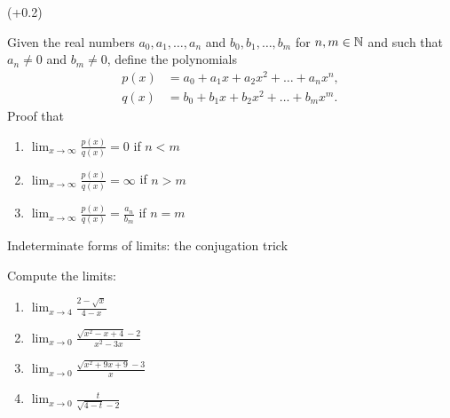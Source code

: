 \documentclass[9pt]{beamer}
\begin{document}
\begin{frame}{ (+0.2)}

    Given the real numbers $a_0, a_1, \dots, a_n$ and $b_0, b_1, \dots, b_m$ for $n, m\in\mathbb{N}$ and such that $a_n \neq 0$ and $b_m \neq 0$, define the polynomials
    \begin{align*}
        p(x) &= a_0 + a_1x + a_2x^2 + \dots + a_n x^n, \\ 
        q(x) &= b_0 + b_1x + b_2x^2 + \dots + b_m x^m.
    \end{align*}
    Proof that
    \begin{enumerate}[leftmargin = 0.5cm, label = (\alph*), rightmargin = 0.2cm]

        \item $\lim_{x\rightarrow \infty} \frac{p(x)}{q(x)} = 0$ if $n < m$
        
        \item $\lim_{x\rightarrow \infty} \frac{p(x)}{q(x)} = \infty$ if $n > m$
        
        \item $\lim_{x\rightarrow \infty} \frac{p(x)}{q(x)} = \frac{a_n}{b_m}$ if $n = m$
        
    \end{enumerate}
    
\end{frame}

\begin{frame}{Indeterminate forms of limits: the conjugation trick}

    Compute the limits:

    \begin{enumerate}[leftmargin = 0.5cm, label = (\alph*), rightmargin = 0.2cm]
        
        \item $\lim_{x\rightarrow 4}\frac{2 - \sqrt{x}}{4 - x}$

        \item $\lim_{x\rightarrow 0}\frac{\sqrt{x^2 - x + 4} - 2}{x^2 - 3x}$

        \item $\lim_{x\rightarrow 0}\frac{\sqrt{x^2 + 9x + 9} - 3}{x}$

        \item $\lim_{x\rightarrow 0}\frac{t}{\sqrt{4 - t} -2}$

    \end{enumerate}
    
\end{frame}
\end{document}
